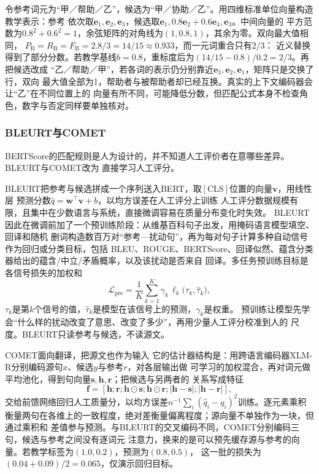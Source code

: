 令参考词元为“甲／帮助／乙”，候选为“甲／协助／乙”。用四维标准单位向量构造教学表示：参考
依次取$\bm e_1,\bm e_2,\bm e_3$，候选取$\bm e_1,0.8\bm e_2+0.6\bm e_4,\bm e_3$。中间向量的
平方范数为$0.8^2+0.6^2=1$，余弦矩阵的对角线为$(1,0.8,1)$，其余为零。双向最大值相同，
$P_{\mathrm B}=R_{\mathrm B}=F_{\mathrm B}=2.8/3=14/15\approx0.933$，而一元词重合只有$2/3$：
近义替换得到了部分分数。若教学基线$b=0.8$，重标度后为$(14/15-0.8)/0.2=2/3$。再把候选改成
“乙／帮助／甲”，若各词的表示仍分别靠近$\bm e_3,\bm e_2,\bm e_1$，矩阵只是交换了行，双向
最大值全部为1，帮助者与被帮助者却已经互换。真实的上下文编码器会让“乙”在不同位置上的
向量有所不同，可能降低分数，但匹配公式本身不检查角色，数字与否定同样要单独核对。

\subsubsection{BLEURT与COMET}
\label{sec:nlp-generation-comet}

BERTScore的匹配规则是人为设计的，并不知道人工评价者在意哪些差异。BLEURT与COMET改为
直接学习人工评分。

BLEURT把参考与候选拼成一个序列送入BERT，取$[\mathrm{CLS}]$位置的向量$\bm v$，用线性层
预测分数$\widehat q=\bm w^\top\bm v+b$，以均方误差在人工评分上训练
人工评分数据规模有限，且集中在少数语言与系统，直接微调容易在质量分布变化时失效。
BLEURT因此在微调前加了一个预训练阶段：从维基百科句子出发，用掩码语言模型填空、回译和随机
删词构造数百万对“参考—扰动句”，再为每对句子计算多种自动信号作为回归或分类目标，包括
BLEU、ROUGE、BERTScore、回译似然、蕴含分类器给出的蕴含/中立/矛盾概率，以及该扰动是否来自
回译。多任务预训练目标是各信号损失的加权和
\begin{equation}
  \mathcal L_{\mathrm{pre}}=\frac{1}{K}\sum_{k=1}^{K}\gamma_k\,\ell_k\bigl(\tau_k,\widehat\tau_k\bigr),
  \label{eq:nlp-generation-bleurt}
\end{equation}
$\tau_k$是第$k$个信号的值，$\widehat\tau_k$是模型在该信号上的预测，$\gamma_k$是权重。
预训练让模型先学会“什么样的扰动改变了意思、改变了多少”，再用少量人工评分校准到人的
尺度。BLEURT只读参考与候选，不读源文。

COMET面向翻译，把源文也作为输入
它的估计器结构是：用跨语言编码器XLM-R分别编码源句$x$、候选$y$与参考$r$，对各层输出做
可学习的加权混合，再对词元做平均池化，得到句向量$\bm s,\bm h,\bm r$；把候选与另两者的
关系写成特征
\begin{equation}
  \bm f=[\bm h;\bm r;\bm h\odot\bm s;\bm h\odot\bm r;|\bm h-\bm s|;|\bm h-\bm r|],
  \label{eq:nlp-generation-comet}
\end{equation}
交给前馈网络回归人工质量分，以均方误差$n^{-1}\sum_i(\widehat q_i-q_i)^2$训练。逐元素乘积
衡量两句在各维上的一致程度，绝对差衡量偏离程度；源向量不单独作为一块，但通过乘积和
差值参与预测。与BLEURT的交叉编码不同，COMET分别编码三句，候选与参考之间没有逐词元
注意力，换来的是可以预先缓存源与参考的向量。若教学标签为$(1.0,0.2)$，预测为$(0.8,0.5)$，
这一批的损失为$(0.04+0.09)/2=0.065$，仅演示回归目标。

